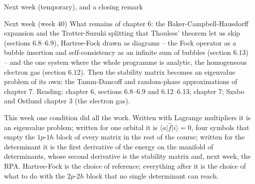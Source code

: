 \documentclass[aspectratio=169,10pt]{beamer}
\newcommand{\element}[3]{\langle #1\vert #2\vert #3\rangle}
\begin{document}
\begin{frame}{Next week (temporary), and a closing remark}
  \begin{exampleblock}{Next week (week 40)}
    What remains of chapter 6: the Baker-Campbell-Hausdorff expansion and the Trotter-Suzuki splitting that Thouless' theorem let us skip (sections 6.8--6.9), Hartree-Fock drawn as diagrams -- the Fock operator as a bubble insertion and self-consistency as an infinite sum of bubbles (section 6.13) -- and the one system where the whole programme is analytic, the homogeneous electron gas (section 6.12). Then the stability matrix becomes an eigenvalue problem of its own: the Tamm-Dancoff and random-phase approximations of chapter 7. Reading: chapter 6, sections 6.8--6.9 and 6.12--6.13; chapter 7; Szabo and Ostlund chapter 3 (the electron gas).
  \end{exampleblock}
  \vspace{0.5em}
  This week one condition did all the work. Written with Lagrange multipliers it is an eigenvalue problem; written for one orbital it is $\element{a}{\hat{f}}{i}=0$, four symbols that empty the $1p$-$1h$ block of every matrix in the rest of the course; written for the determinant it is the first derivative of the energy on the manifold of determinants, whose second derivative is the stability matrix and, next week, the RPA. Hartree-Fock is the choice of reference; everything after it is the choice of what to do with the $2p$-$2h$ block that no single determinant can reach.
\end{frame}
\end{document}
